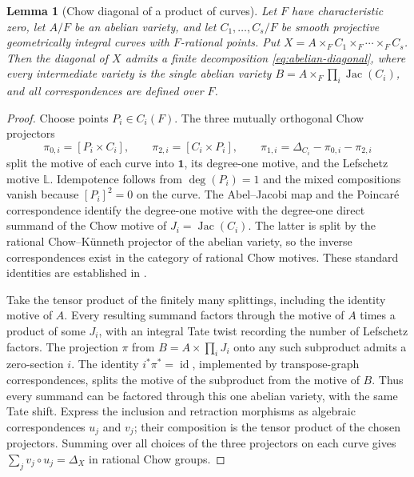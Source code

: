 \documentclass[11pt]{article}
\newtheorem{lemma}[theorem]{Lemma}
\theoremstyle{definition}
\theoremstyle{remark}
\numberwithin{equation}{section}
\begin{document}
\begin{lemma}[Chow diagonal of a product of curves]
\label{lem:curve-product-diagonal}
Let $F$ have characteristic zero, let $A/F$ be an abelian variety,
and let $C_1,\ldots,C_s/F$ be smooth projective geometrically
integral curves with $F$-rational points.  Put
$X=A\times_F C_1\times_F\cdots\times_F C_s$.
Then the diagonal of $X$ admits a finite decomposition
\eqref{eq:abelian-diagonal}, where every intermediate variety
is the single abelian variety
$B=A\times_F\prod_i\operatorname{Jac}(C_i)$,
and all correspondences are defined over $F$.
\end{lemma}

\begin{proof}
Choose points $P_i\in C_i(F)$.  The three mutually orthogonal
Chow projectors
\[
 \pi_{0,i}=[P_i\times C_i],\qquad
 \pi_{2,i}=[C_i\times P_i],\qquad
 \pi_{1,i}=\Delta_{C_i}-\pi_{0,i}-\pi_{2,i}
\]
split the motive of each curve into $\mathbf 1$, its
degree-one motive, and the Lefschetz motive $\mathbb L$.
Idempotence follows from $\deg(P_i)=1$ and the mixed
compositions vanish because $[P_i]^2=0$ on the curve.
The Abel--Jacobi map and the Poincar\'e correspondence identify
the degree-one motive with the degree-one direct summand of
the Chow motive of $J_i=\operatorname{Jac}(C_i)$.  The latter
is split by the rational Chow--K\"unneth projector of the
abelian variety, so the inverse correspondences exist in the
category of rational Chow motives.  These standard identities
are established in \cite[Sections~3 and~5]{Scholl}.

Take the tensor product of the finitely many splittings, including
the identity motive of $A$.  Every resulting summand factors
through the motive of $A$ times a product of some $J_i$, with
an integral Tate twist recording the number of Lefschetz factors.
The projection $\pi$ from $B=A\times\prod_i J_i$ onto any such
subproduct admits a zero-section $i$.  The identity
$i^*\pi^*=\operatorname{id}$, implemented by transpose-graph
correspondences, splits the motive of the subproduct from
the motive of $B$.  Thus every summand can be
factored through this one abelian variety, with the same Tate
shift.
Express the inclusion and retraction morphisms as algebraic
correspondences $u_j$ and $v_j$; their composition is the tensor
product of the chosen projectors.  Summing over all choices of
the three projectors on each curve gives
$\sum_jv_j\circ u_j=\Delta_X$ in rational Chow groups.
\end{proof}
\end{document}
